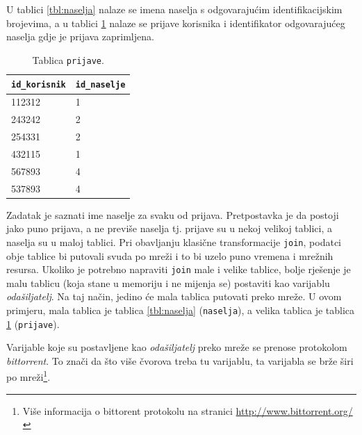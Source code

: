 \documentclass[times, utf8, zavrsni, numeric]{fer}
\begin{document}
U tablici \ref{tbl:naselja} nalaze se imena naselja s odgovarajućim identifikacijskim brojevima, a u tablici \ref{tbl:prijave} nalaze se prijave korisnika i identifikator odgovarajućeg naselja gdje je prijava zaprimljena.

\begin{table}[htb]
\caption{Tablica \texttt{prijave}.}
\label{tbl:prijave}
\centering
\begin{tabular}{ll} 
\hline
\texttt{id\_korisnik} & \texttt{id\_naselje}\\
\hline
112312 & 1\\
243242 & 2\\
254331 & 2\\
432115 & 1\\
567893 & 4\\
537893 & 4\\
\hline
\end{tabular}
\end{table}

Zadatak je saznati ime naselje za svaku od prijava. Pretpostavka je da postoji jako puno prijava, a ne previše naselja tj. prijave su u nekoj velikoj tablici, a naselja su u maloj tablici. Pri obavljanju klasične transformacije \texttt{join}, podatci obje tablice bi putovali svuda po mreži i to bi uzelo puno vremena i mrežnih resursa. Ukoliko je potrebno napraviti \texttt{join} male i velike tablice, bolje rješenje je malu tablicu (koja stane u memoriju i ne mijenja se) postaviti kao varijablu \emph{odašiljatelj}. Na taj način, jedino će mala tablica putovati preko mreže. U ovom primjeru, mala tablica je tablica  \ref{tbl:naselja} (\texttt{naselja}), a velika tablica je tablica \ref{tbl:prijave} (\texttt{prijave}). 

Varijable koje su postavljene kao \emph{odašiljatelj} preko mreže se prenose protokolom \emph{bittorrent}. To znači da što više čvorova treba tu varijablu, ta varijabla se brže širi po mreži\footnote{Više informacija o bittorent protokolu na stranici \url{http://www.bittorrent.org/}}. 
\end{document}
